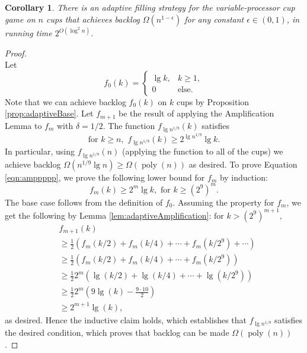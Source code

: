 \documentclass[twocolumn]{article}[11pt]
\renewcommand{\paragraph}[1]{\vspace{0.09in}\noindent{\bf \boldmath #1.}}
\DeclareMathOperator{\poly}{\text{poly}}
\newtheorem{corollary}{Corollary}
\begin{document}
\begin{corollary}
  \label{cor:adaptivePoly}
  There is an adaptive filling strategy for the variable-processor cup game on
  $n$ cups that achieves backlog $\Omega(n^{1-\epsilon})$ for any constant
  $\epsilon \in (0,1)$, in running time $2^{O(\log^2 n)}$.
\end{corollary}
\begin{proof}$ $\\
  \paragraph{Basic Idea}
  Let
  $$f_0(k) = 
  \begin{cases} 
    \lg k, & k\geq 1, \\
    0 & \text{else.}
  \end{cases}$$
  Note that we can achieve backlog $f_0(k)$ on $k$ cups by Proposition \ref{prop:adaptiveBase}.
  Let $f_{m+1} $ be the result of applying the Amplification Lemma to $f_m$ with $\delta=1/2$. 
  The function $f_{\lg n^{1/9}}(k)$ satisfies 
  \begin{equation}\label{eqn:amppppp}
  \text{for } k \geq n,\,\, f_{\lg n^{1/9}}(k) \geq 2^{\lg n^{1/9}} \lg k.
  \end{equation}
  In particular, using $f_{\lg n^{1/9}}(n)$ (applying the function to all of
  the cups) we achieve backlog $\Omega(n^{1/9}\lg n) \ge \Omega(\poly(n))$
  as desired.
  To prove Equation \ref{eqn:amppppp}, we prove the following lower bound for $f_m$ by induction:
  $$f_m(k) \geq 2^m \lg k, \text{ for } k \geq (2^9)^m.$$
  The base case follows from the definition of $f_0$. Assuming the property for
  $f_m$, we get the following by Lemma \ref{lem:adaptiveAmplification}:
  $ \text{for } k > (2^9)^{m+1},$
  \begin{align*}
  &f_{m+1}(k) \\
  &\ge \frac{1}{2}(f_m(k/2) + f_m(k/4) + \cdots + f_m(k/2^9) + \cdots)\\
  &\geq \frac{1}{2}(f_m(k/2) + f_m(k/4) + \cdots + f_m(k/2^9))\\
  &\geq \frac{1}{2}2^m(\lg (k/2) + \lg(k/4) + \cdots + \lg(k/2^9))\\
  &\geq \frac{1}{2}2^m(9\lg (k) - \frac{9 \cdot 10}{2}) \\
  &\geq 2^{m+1} \lg(k) ,
  \end{align*}
  as desired. Hence the inductive claim holds, which establishes that $f_{\lg
  n^{1/9}}$ satisfies the desired condition, which proves that backlog can be
  made $\Omega(\poly(n))$.


\end{proof}
\end{document}
